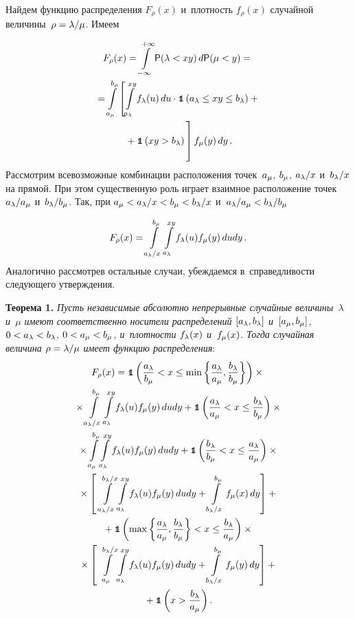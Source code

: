 \begin{multicols}{2}
Найдем функцию распределения $F_\rho(x)$ и~плотность $f_\rho(x)$ случайной 
величины~$\rho\hm=\lambda/\mu$. Имеем

\noindent
\begin{multline*}
F_\rho(x)=\il{-\infty}{+\infty}{\sf P}(\lambda<xy)\, d{\sf P}(\mu<y)={}\\[-1pt]
{}=\il{\am}{\bmm} \left[\il{\al}{xy}\fl(u)\, du\cdot
\Ik\left(\al\le xy\le \bll\right)+{}\right.\\[-1pt]
\left.{}+\Ik\left(xy>\bll\right)
\vphantom{\il{\am}{\bmm}}
\right] \fm(y)\, dy\,.
\end{multline*}
Рассмотрим всевозможные комбинации расположения точек~$\am$, $\bmm$, 
$\al/x$ и~$\bll/x$ на прямой. При этом существенную роль играет взаимное 
расположение точек~$\al/\am$ и~$\bll/\bmm$. Так, при $\am\hm<\al/x\hm<\bmm\hm<\bll/x$ 
и~$\al/\am\hm<\bll/\bmm$

\noindent
$$
F_\rho(x)=\il{\al/x}{\bmm}\il{\al}{xy}\fl(u)\fm(y)\, dudy\,.
$$
Аналогично рассмотрев остальные случаи, убеждаемся в~справедливости следующего 
утверждения.

\smallskip

\noindent
\textbf{Теорема 1.} \textit{Пусть независимые абсолютно непрерывные случайные 
величины~$\lambda$ и~$\mu$ имеют соответственно носители 
распределений $[\al,\bll]$ и~$[\am,\bmm]$, $0\hm<\al\hm<\bll$, $0\hm<\am\hm<\bmm$, 
и~плот\-ности $\fl(x)$ и~$\fm(x)$. Тогда случайная величина 
$\rho\hm=\lambda/\mu$ имеет функцию распределения}:
\begin{multline*}
F_\rho(x)=\Ik\left(\fr{\al}{\bmm}<x\le 
\min\left\{\fr{\al}{\am},\fr{\bll}{\bmm}\right\}\right)\times{}\\
{}\times \il{\al/x}{\bmm}
\il{\al}{xy}\fl(u)\fm(y)\, dudy+\Ik\left(\fr{\al}{\am}<x\le 
\fr{\bll}{\bmm}\right)\times{}\\
{}\times \il{\am}{\bmm}\il{\al}{xy}\fl(u)\fm(y)\, dudy+
\Ik\left(\fr{\bll}{\bmm}<x\le \fr{\al}{\am}\right)\times{}\\
{}\times \left[\ \il{\al/x}{\bll/x}\il{\al}{xy}\fl(u)\fm(y)\, dudy +
\il{\bll/x}{\bmm}\fm(x)\, dy\right]+{}\\
{}+\Ik\left(\max\left\{\fr{\al}{\am},\fr{\bll}{\bmm}\right\}<x\le\fr{\bll}{\am}\right)\times{}\\
{}\times
\left[\ \il{\am}{\bll/x}\il{\al}{xy}\fl(u)\fm(y)\, dudy+\il{\bll/x}{\bmm}\fm(y)\, dy\right]+{}\\
{}+\Ik\left(x>\fr{\bll}{\am}\right).
\end{multline*}



\end{multicols}
